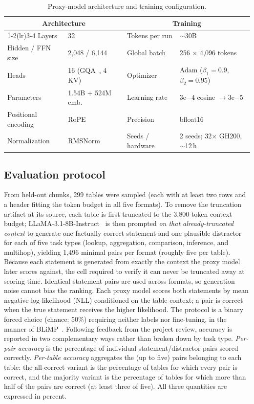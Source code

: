 \documentclass[11pt,a4paper]{article}
\begin{document}
\begin{table}[ht]
\centering
\small
\begin{tabular}{llll}
\toprule
\multicolumn{2}{c}{\textbf{Architecture}} & \multicolumn{2}{c}{\textbf{Training}}\\
\cmidrule(lr){1-2}\cmidrule(lr){3-4}
Layers & 32 & Tokens per run & $\sim$30B\\
Hidden / FFN size & 2{,}048 / 6{,}144 & Global batch & 256 $\times$ 4{,}096 tokens\\
Heads & 16 (GQA~\cite{gqa}, 4 KV) & Optimizer & Adam ($\beta_1{=}0.9$, $\beta_2{=}0.95$)\\
Parameters & 1.54B + 524M emb. & Learning rate & $3\mathrm{e}{-4}$ cosine $\rightarrow 3\mathrm{e}{-5}$\\
Positional encoding & RoPE~\cite{rope} & Precision & bfloat16\\
Normalization & RMSNorm & Seeds / hardware & 2 seeds; 32$\times$ GH200, $\sim$12\,h\\
\bottomrule
\end{tabular}
\caption{Proxy-model architecture and training configuration.}
\label{tab:model}
\end{table}
\subsection{Evaluation protocol}
\label{sec:eval}
From held-out chunks, 299 tables were sampled (each with at least two rows and a header fitting the token budget in all five formats). To remove the truncation artifact at its source, each table is first truncated to the 3{,}800-token context budget; LLaMA-3.1-8B-Instruct~\cite{llama3} is then prompted \emph{on that already-truncated context} to generate one factually correct statement and one plausible distractor for each of five task types (lookup, aggregation, comparison, inference, and multihop), yielding 1{,}496 minimal pairs per format (roughly five per table). Because each statement is generated from exactly the context the proxy model later scores against, the cell required to verify it can never be truncated away at scoring time. Identical statement pairs are used across formats, so generation noise cannot bias the ranking. Each proxy model scores both statements by mean negative log-likelihood (NLL) conditioned on the table context; a pair is correct when the true statement receives the higher likelihood. The protocol is a binary forced choice (chance: 50\%) requiring neither labels nor fine-tuning, in the manner of BLiMP~\cite{blimp}. Following feedback from the project review, accuracy is reported in two complementary ways rather than broken down by task type. \emph{Per-pair accuracy} is the percentage of individual statement/distractor pairs scored correctly. \emph{Per-table accuracy} aggregates the (up to five) pairs belonging to each table: the all-correct variant is the percentage of tables for which every pair is correct, and the majority variant is the percentage of tables for which more than half of the pairs are correct (at least three of five). All three quantities are expressed in percent.
\end{document}
